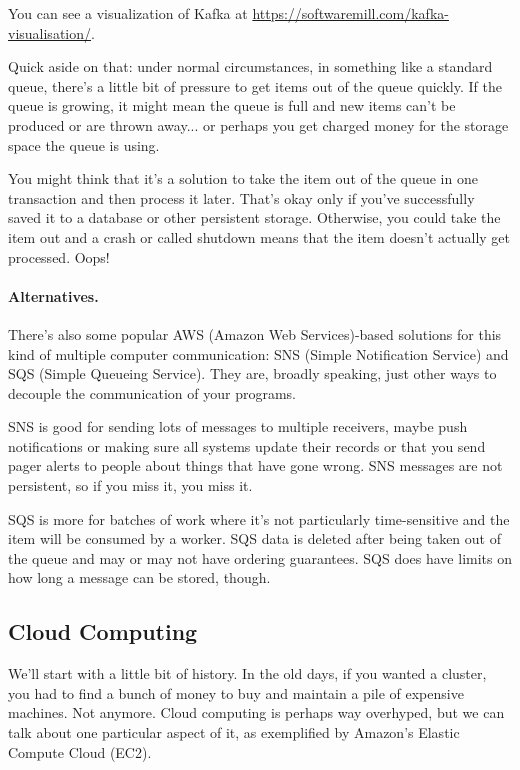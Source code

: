 \documentclass[a4paper]{report}
\begin{document}
You can see a visualization of Kafka at \href{https://softwaremill.com/kafka-visualisation/}{https://softwaremill.com/kafka-visualisation/}.

Quick aside on that: under normal circumstances, in something like a standard queue, there's a little bit of pressure to get items out of the queue quickly. If the queue is growing, it might mean the queue is full and new items can't be produced or are thrown away... or perhaps you get charged money for the storage space the queue is using. 

You might think that it's a solution to take the item out of the queue in one transaction and then process it later. That's okay only if you've successfully saved it to a database or other persistent storage. Otherwise, you could take the item out and a crash or called shutdown means that the item doesn't actually get processed. Oops!

\paragraph{Alternatives.} There's also some popular AWS (Amazon Web Services)-based solutions for this kind of multiple computer communication: SNS (Simple Notification Service) and SQS (Simple Queueing Service). They are, broadly speaking, just other ways to decouple the communication of your programs.

SNS is good for sending lots of messages to multiple receivers, maybe push notifications or making sure all systems update their records or that you send pager alerts to people about things that have gone wrong. SNS messages are not persistent, so if you miss it, you miss it. 

SQS is more for batches of work where it's not particularly time-sensitive and the item will be consumed by a worker. SQS data is deleted after being taken out of the queue and may or may not have ordering guarantees. SQS does have limits on how long a message can be stored, though. 

\subsection*{Cloud Computing}
We'll start with a little bit of history.
In the old days, if you wanted a cluster, you had to find a bunch of
money to buy and maintain a pile of expensive machines. Not anymore.
Cloud computing is perhaps way overhyped, but we can talk about 
one particular aspect of it, as exemplified by Amazon's Elastic
Compute Cloud (EC2).
\end{document}
